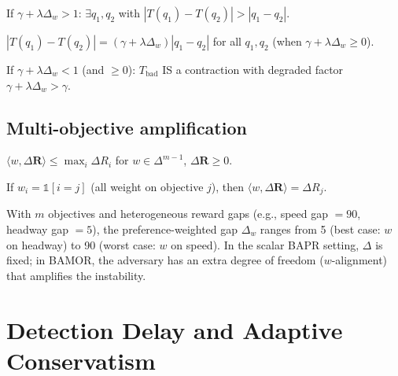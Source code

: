 \begin{theorem}
If $\gamma + \lambda\Delta_w > 1$: $\exists q_1, q_2$ with $|T(q_1) - T(q_2)| > |q_1 - q_2|$.
\end{theorem}

\begin{theorem}
$|T(q_1) - T(q_2)| = (\gamma + \lambda\Delta_w)|q_1 - q_2|$ for all $q_1, q_2$ (when $\gamma + \lambda\Delta_w \ge 0$).
\end{theorem}

\begin{theorem}
If $\gamma + \lambda\Delta_w < 1$ (and $\ge 0$): $T_{\mathrm{bad}}$ IS a contraction with degraded factor $\gamma + \lambda\Delta_w > \gamma$.
\end{theorem}

\subsection{Multi-objective amplification}

\begin{theorem}
$\langle w, \Delta\mathbf{R} \rangle \le \max_i \Delta R_i$ for $w \in \Delta^{m-1}$, $\Delta\mathbf{R} \ge 0$.
\end{theorem}

\begin{theorem}
If $w_i = \mathbb{1}[i = j]$ (all weight on objective $j$), then $\langle w, \Delta\mathbf{R} \rangle = \Delta R_j$.
\end{theorem}

\begin{remark}
With $m$ objectives and heterogeneous reward gaps (e.g., speed gap $= 90$, headway gap $= 5$), the preference-weighted gap $\Delta_w$ ranges from 5 (best case: $w$ on headway) to 90 (worst case: $w$ on speed).  In the scalar BAPR setting, $\Delta$ is fixed; in BAMOR, the adversary has an extra degree of freedom ($w$-alignment) that amplifies the instability.
\end{remark}


\section{Detection Delay and Adaptive Conservatism}
\label{app:detection}

